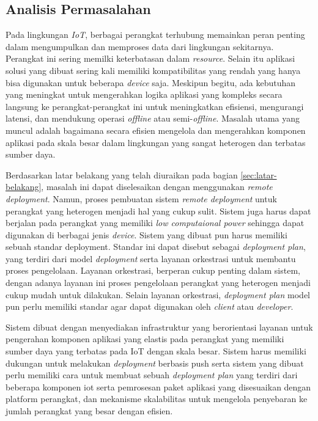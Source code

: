 \subsection{Analisis Permasalahan}
\label{sec:analisis-permasalahan}

Pada lingkungan \textit{IoT}, berbagai perangkat terhubung memainkan peran penting dalam mengumpulkan dan memproses data dari lingkungan sekitarnya. Perangkat ini sering memilki keterbatasan dalam \textit{resource}. Selain itu aplikasi solusi yang dibuat sering kali memiliki kompatibilitas yang rendah yang hanya bisa digunakan untuk beberapa \textit{device} saja. Meskipun begitu, ada kebutuhan yang meningkat untuk mengerahkan logika aplikasi yang kompleks secara langsung ke perangkat-perangkat ini untuk meningkatkan efisiensi, mengurangi latensi, dan mendukung operasi \textit{offline} atau semi-\textit{offline}. Masalah utama yang muncul adalah bagaimana secara efisien mengelola dan mengerahkan komponen aplikasi pada skala besar dalam lingkungan yang sangat heterogen dan terbatas sumber daya.

Berdasarkan latar belakang yang telah diuraikan pada bagian \ref{sec:latar-belakang}, masalah ini dapat diselesaikan dengan menggunakan \textit{remote deployment}. Namun, proses pembuatan sistem \textit{remote deployment} untuk perangkat yang heterogen menjadi hal yang cukup sulit. Sistem juga harus dapat berjalan pada perangkat yang memiliki \textit{low computaional power}  sehingga dapat digunakan di berbagai jenis \textit{device}. Sistem yang dibuat pun harus memiliki sebuah standar deployment. Standar ini dapat disebut sebagai \textit{deployment plan}, yang terdiri dari model \textit{deployment} serta layanan orkestrasi untuk membantu proses pengelolaan. Layanan orkestrasi, berperan cukup penting dalam sistem, dengan adanya layanan ini proses pengelolaan perangkat yang heterogen menjadi cukup mudah untuk dilakukan. Selain layanan orkestrasi, \textit{deployment plan} model pun perlu memiliki standar agar dapat digunakan oleh \textit{client} atau \textit{developer}.

Sistem dibuat dengan menyediakan infrastruktur yang berorientasi layanan untuk pengerahan komponen aplikasi yang elastis pada perangkat yang memiliki sumber daya yang terbatas pada IoT dengan skala besar. Sistem harus memiliki dukungan untuk melakukan \textit{deployment} berbasis push serta sistem yang dibuat perlu memiliki cara untuk membuat sebuah \textit{deployment plan} yang terdiri dari beberapa komponen iot serta
pemrosesan paket aplikasi yang disesuaikan dengan platform perangkat, dan mekanisme skalabilitas untuk mengelola penyebaran ke jumlah perangkat yang besar dengan efisien.


